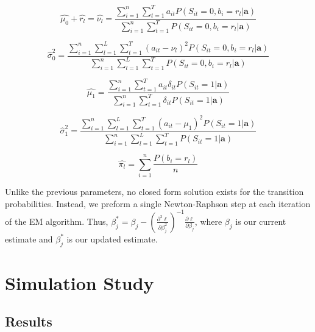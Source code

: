 \documentclass{article}
\begin{document}
\begin{equation}\label{mu0}
    \hat{\mu_0} + \hat{r_l} = \hat{\nu_l} = 
    \frac{\sum_{i=1}^n \sum_{t=1}^T a_{it}P(S_{it}=0,b_{i}=r_l|\textbf{a})}
    {\sum_{i=1}^n \sum_{t=1}^T P(S_{it}=0,b_{i}=r_l|\textbf{a})}
\end{equation} 

\begin{equation}\label{sig0}
    \hat{\sigma}_0^2 = 
    \frac{\sum_{i=1}^n \sum_{l=1}^L \sum_{t=1}^T 
        (a_{it}-\nu_l)^2 P(S_{it}=0,b_{i}=r_l|\textbf{a})}
        {\sum_{i=1}^n \sum_{l=1}^L \sum_{t=1}^T P(S_{it}=0,b_{i}=r_l|\textbf{a})}
\end{equation} 

\begin{equation}\label{mu1}
    \hat{\mu_1} = 
    \frac{\sum_{i=1}^n \sum_{t=1}^T a_{it}\delta_{it}P(S_{it}=1|\textbf{a})}
        {\sum_{i=1}^n \sum_{t=1}^T \delta_{it}P(S_{it}=1|\textbf{a})}
\end{equation} 

\begin{equation}\label{sig1}
    \hat{\sigma}_1^2 = 
    \frac{\sum_{i=1}^n \sum_{l=1}^L \sum_{t=1}^T 
        (a_{it}-\mu_1)^2 P(S_{it}=1|\textbf{a})}
        {\sum_{i=1}^n \sum_{l=1}^L \sum_{t=1}^T P(S_{it}=1|\textbf{a})}
\end{equation} 

\begin{equation}\label{pi}
    \hat{\pi_l} = \sum_{i = 1}^n \frac{P(b_i = r_l)}{n}
\end{equation}


Unlike the previous parameters, no closed form solution exists for the transition probabilities. Instead, we preform a single Newton-Raphson step at each iteration of the EM algorithm. Thus, $\beta_{j}^* = \beta_{j} - (\frac{\partial^2\ell}{\partial \beta_{j}^2})^{-1} \frac{\partial\ell}{\partial \beta_{j}}$, where $\beta_{j}$ is our current estimate and $\beta_{j}^*$ is our updated estimate. 

\newpage

\section{Simulation Study}\label{SimStudy}

\subsection{Results}\label{SimStudyResults}
\end{document}
